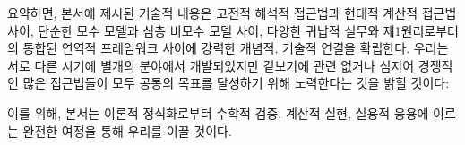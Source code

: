 \documentclass[../../book-main_ko.tex]{subfiles}
\begin{document}
요약하면, 본서에 제시된 기술적 내용은 고전적 해석적 접근법과 현대적 계산적 접근법 사이, 단순한 모수 모델과 심층 비모수 모델 사이, 다양한 귀납적 실무와 제1원리로부터의 통합된 연역적 프레임워크 사이에 강력한 개념적, 기술적 연결을 확립한다. 우리는 서로 다른 시기에 별개의 분야에서 개발되었지만 겉보기에 관련 없거나 심지어 경쟁적인 많은 접근법들이 모두 공통의 목표를 달성하기 위해 노력한다는 것을 밝힐 것이다:
\begin{quote}
\end{quote}
이를 위해, 본서는 이론적 정식화로부터 수학적 검증, 계산적 실현, 실용적 응용에 이르는 완전한 여정을 통해 우리를 이끌 것이다.
\end{document}
